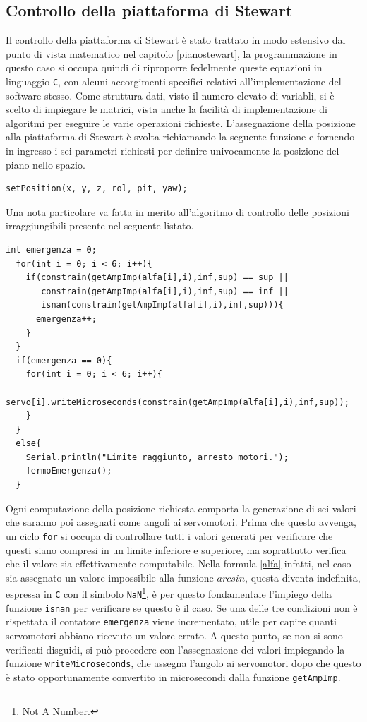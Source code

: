 \documentclass[12pt,twoside,openright]{report}
\begin{document}
\subsection{Controllo della piattaforma di Stewart}
Il controllo della piattaforma di Stewart è stato trattato in modo estensivo dal punto di vista matematico nel capitolo \ref{pianostewart}, la programmazione in questo caso si occupa quindi di riproporre fedelmente queste equazioni in linguaggio \texttt{C}, con alcuni accorgimenti specifici relativi all'implementazione del software stesso. Come struttura dati, visto il numero elevato di variabli, si è scelto di impiegare le matrici, vista anche la facilità di implementazione di algoritmi per eseguire le varie operazioni richieste. 
L'assegnazione della posizione alla piattaforma di Stewart è svolta richiamando la seguente funzione e fornendo in ingresso i sei parametri richiesti per definire univocamente la posizione del piano nello spazio.
\begin{verbatim}
setPosition(x, y, z, rol, pit, yaw);
\end{verbatim}
Una nota particolare va fatta in merito all'algoritmo di controllo delle posizioni irraggiungibili presente nel seguente listato.
\begin{verbatim}
int emergenza = 0;
  for(int i = 0; i < 6; i++){
    if(constrain(getAmpImp(alfa[i],i),inf,sup) == sup ||
       constrain(getAmpImp(alfa[i],i),inf,sup) == inf ||
       isnan(constrain(getAmpImp(alfa[i],i),inf,sup))){     
      emergenza++;
    }
  }
  if(emergenza == 0){
    for(int i = 0; i < 6; i++){
        servo[i].writeMicroseconds(constrain(getAmpImp(alfa[i],i),inf,sup));
    }
  }
  else{
    Serial.println("Limite raggiunto, arresto motori.");
    fermoEmergenza();
  }
\end{verbatim}
Ogni computazione della posizione richiesta comporta la generazione di sei valori che saranno poi assegnati come angoli ai servomotori. Prima che questo avvenga, un ciclo \texttt{for} si occupa di controllare tutti i valori generati per verificare che questi siano compresi in un limite inferiore e superiore, ma soprattutto verifica che il valore sia effettivamente computabile. Nella formula \eqref{alfa} infatti, nel caso sia assegnato un valore impossibile alla funzione $arcsin$, questa diventa indefinita, espressa in \texttt{C} con il simbolo \texttt{NaN}\footnote{Not A Number.}, è per questo fondamentale l'impiego della funzione \texttt{isnan} per verificare se questo è il caso. Se una delle tre condizioni non è rispettata il contatore \texttt{emergenza} viene incrementato, utile per capire quanti servomotori abbiano ricevuto un valore errato. A questo punto, se non si sono verificati disguidi, si può procedere con l'assegnazione dei valori impiegando la funzione \texttt{writeMicroseconds}, che assegna l'angolo ai servomotori dopo che questo è stato opportunamente convertito in microsecondi dalla funzione \texttt{getAmpImp}.
\end{document}
